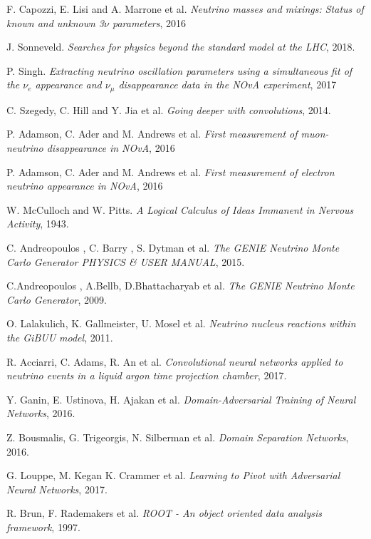 \documentclass[11pt]{article}
\begin{document}
\noindent
F. Capozzi, E. Lisi and A. Marrone et al. \textit{Neutrino masses and mixings: Status of known and unknown 3$\nu$ parameters}, 2016 \bigskip

\noindent
J. Sonneveld. \textit{Searches for physics beyond the standard model at the LHC}, 2018.\bigskip

\noindent
P. Singh. \textit{Extracting neutrino oscillation parameters using a simultaneous fit of the $\nu_e$ appearance and $\nu_\mu$ disappearance data in the NOvA experiment}, 2017\bigskip

\noindent
C. Szegedy, C. Hill  and Y. Jia et al. \textit{Going deeper with convolutions}, 2014.\bigskip 

\noindent
P. Adamson, C. Ader and M. Andrews et al. \textit{First measurement of muon-neutrino disappearance in NOvA}, 2016 \bigskip 

\noindent
P. Adamson, C. Ader and M. Andrews et al. \textit{First measurement of electron neutrino appearance in NOvA}, 2016 \bigskip 

\noindent
W. McCulloch and W. Pitts. \textit{A Logical Calculus of Ideas Immanent in Nervous Activity}, 1943. \bigskip 

\noindent
C. Andreopoulos , C. Barry , S. Dytman et al. \textit{The GENIE Neutrino Monte Carlo Generator PHYSICS \& USER MANUAL}, 2015.\bigskip

\noindent
C.Andreopoulos , A.Bellb, D.Bhattacharyab et al. \textit{The GENIE Neutrino Monte Carlo Generator}, 2009. \bigskip

\noindent
O. Lalakulich, K. Gallmeister, U. Mosel et al. \textit{Neutrino nucleus reactions within the GiBUU model}, 2011. \bigskip

\noindent
R. Acciarri, C. Adams, R. An et al. \textit{Convolutional neural networks applied to neutrino events in a liquid argon time projection chamber}, 2017.\bigskip 

\noindent
Y. Ganin, E. Ustinova, H. Ajakan et al. \textit{Domain-Adversarial Training of Neural Networks}, 2016. \bigskip

\noindent
Z. Bousmalis, G. Trigeorgis, N. Silberman et al. \textit{Domain Separation Networks}, 2016.\bigskip

\noindent
G. Louppe, M. Kegan K. Crammer et al. \textit{Learning to Pivot with Adversarial Neural Networks}, 2017.\bigskip

\noindent
R. Brun, F. Rademakers et al. \textit{ROOT - An object oriented data analysis framework}, 1997.\bigskip
\end{document}
